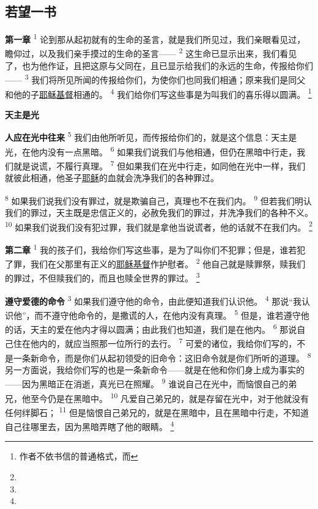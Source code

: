 \setlength\columnsep{0.6cm}
\begin{multicols}{2}

\chapter*{若望一书}


\textbf{第一章\quad}
\textsuperscript{1}
论到那从起初就有的生命的圣言，就是我们所见过，我们亲眼看见过，瞻仰过，以及我们亲手摸过的生命的圣言——
\textsuperscript{2}
这生命已显示出来，我们看见了，也为他作证，且把这原与父同在，且已显示给我们的永远的生命，传报给你们——
\textsuperscript{3}
我们将所见所闻的传报给你们，为使你们也同我们相通；原来我们是同父和他的子\uline{耶稣}\uline{基督}相通的。
\textsuperscript{4}
我们给你们写这些事是为叫我们的喜乐得以圆满。
\renewcommand\thefootnote{\ding{\numexpr171+\value{footnote}}}
\footnote{作者不依书信的普通格式，而}

\begin{center}
	\textbf{\large{\songti 天主是光}}
\end{center}

\textbf{人应在光中往来\quad}
\textsuperscript{5}
我们由他所听见，而传报给你们的，就是这个信息：天主是光，在他内没有一点黑暗。
\textsuperscript{6}
如果我们说我们与他相通，但仍在黑暗中行走，我们就是说谎，不履行真理。
\textsuperscript{7}
但如果我们在光中行走，如同他在光中一样，我们就彼此相通，他圣子\uline{耶稣}的血就会洗净我们的各种罪过。

\textsuperscript{8}
如果我们说我们没有罪过，就是欺骗自己，真理也不在我们内。
\textsuperscript{9}
但若我们明认我们的罪过，天主既是忠信正义的，必赦免我们的罪过，并洗净我们的各种不义。
\textsuperscript{10}
如果我们说我们没有犯过罪，我们就是拿他当说谎者，他的话就不在我们内。
\footnote{}

\textbf{第二章\quad}
\textsuperscript{1}
我的孩子们，我给你们写这些事，是为了叫你们不犯罪；但是，谁若犯了罪，我们在父那里有正义的\uline{耶稣}\uline{基督}作护慰者。
\textsuperscript{2}
他自己就是赎罪祭，赎我们的罪过，不但赎我们的，而且也赎全世界的罪过。
\footnote{}

\textbf{遵守爱德的命令\quad}
\textsuperscript{3}
如果我们遵守他的命令，由此便知道我们认识他。
\textsuperscript{4}
那说“我认识他”，而不遵守他命令的，是撒谎的人，在他内没有真理。
\textsuperscript{5}
但是，谁若遵守他的话，天主的爱在他内才得以圆满；由此我们也知道，我们是在他内。
\textsuperscript{6}
那说自己住在他内的，就应当照那一位所行的去行。
\textsuperscript{7}
可爱的诸位，我给你们写的，不是一条新命令，而是你们从起初领受的旧命令：这旧命令就是你们所听的道理。
\textsuperscript{8}
另一方面说，我给你们写的也是一条新命令——就是在他和你们身上成为事实的——因为黑暗正在消逝，真光已在照耀。
\textsuperscript{9}
谁说自己在光中，而恼恨自己的弟兄，他至今仍是在黑暗中。
\textsuperscript{10}
凡爱自己弟兄的，就是存留在光中，对于他就没有任何绊脚石；
\textsuperscript{11}
但是恼恨自己弟兄的，就是在黑暗中，且在黑暗中行走，不知道自己往哪里去，因为黑暗弄瞎了他的眼睛。
\footnote{}


\end{multicols}
